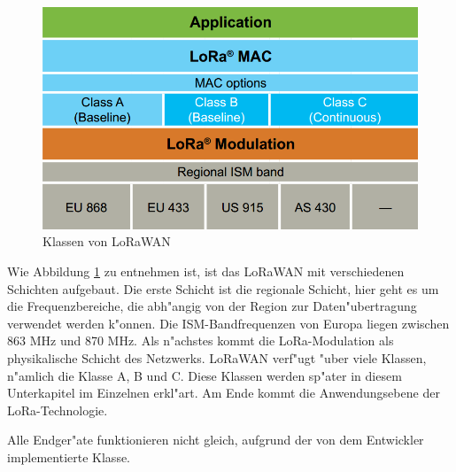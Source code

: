 \begin{figure}[h]
	\centering
	\includegraphics[width=13.5cm]{source/images/LoRa_MAC}
	\caption{Klassen von LoRaWAN \cite{LoRaWAN}\label{fig:LoRaMAC}}
\end{figure}

Wie Abbildung \ref{fig:LoRaMAC} zu entnehmen ist, ist das 
LoRaWAN mit verschiedenen Schichten aufgebaut. Die erste Schicht ist 
die regionale Schicht, hier geht es um die Frequenzbereiche, die 
abh"angig von der Region zur Daten"ubertragung verwendet werden k"onnen. 
Die ISM-Bandfrequenzen von Europa liegen zwischen 863 MHz und 870 MHz.
Als n"achstes kommt die LoRa-Modulation als physikalische Schicht des 
Netzwerks. LoRaWAN verf"ugt "uber viele Klassen, n"amlich die Klasse A, 
B und C. Diese Klassen werden sp"ater in diesem Unterkapitel im 
Einzelnen erkl"art. Am Ende kommt die Anwendungsebene der LoRa-Technologie.

Alle Endger"ate funktionieren nicht gleich, aufgrund der von dem 
Entwickler implementierte Klasse.

